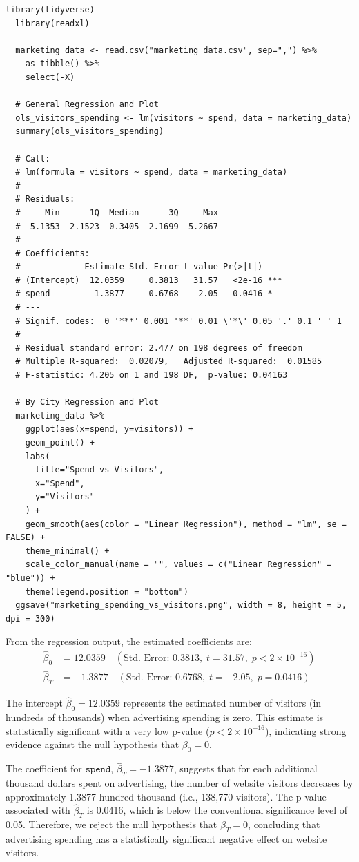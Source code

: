 \documentclass{article}
\begin{document}
\begin{lstlisting}[style=Rstyle, caption=Linear Model for Visitors]
  library(tidyverse)
  library(readxl)
  
  marketing_data <- read.csv("marketing_data.csv", sep=",") %>% 
    as_tibble() %>% 
    select(-X)
  
  # General Regression and Plot
  ols_visitors_spending <- lm(visitors ~ spend, data = marketing_data)
  summary(ols_visitors_spending)
  
  # Call:
  # lm(formula = visitors ~ spend, data = marketing_data)
  # 
  # Residuals:
  #     Min      1Q  Median      3Q     Max 
  # -5.1353 -2.1523  0.3405  2.1699  5.2667 
  # 
  # Coefficients:
  #             Estimate Std. Error t value Pr(>|t|)    
  # (Intercept)  12.0359     0.3813   31.57   <2e-16 ***
  # spend        -1.3877     0.6768   -2.05   0.0416 *  
  # ---
  # Signif. codes:  0 '***' 0.001 '**' 0.01 \'*\' 0.05 '.' 0.1 ' ' 1
  # 
  # Residual standard error: 2.477 on 198 degrees of freedom
  # Multiple R-squared:  0.02079,	Adjusted R-squared:  0.01585 
  # F-statistic: 4.205 on 1 and 198 DF,  p-value: 0.04163
  
  # By City Regression and Plot
  marketing_data %>% 
    ggplot(aes(x=spend, y=visitors)) +
    geom_point() +
    labs(
      title="Spend vs Visitors",
      x="Spend",
      y="Visitors"
    ) +
    geom_smooth(aes(color = "Linear Regression"), method = "lm", se = FALSE) +
    theme_minimal() +
    scale_color_manual(name = "", values = c("Linear Regression" = "blue")) +
    theme(legend.position = "bottom")
  ggsave("marketing_spending_vs_visitors.png", width = 8, height = 5, dpi = 300)
\end{lstlisting}

From the regression output, the estimated coefficients are:
\[
\begin{aligned}
\hat{\beta}_0 &= 12.0359 \quad (\text{Std. Error: } 0.3813, \; t = 31.57, \; p < 2 \times 10^{-16}) \\
\hat{\beta}_T &= -1.3877 \quad (\text{Std. Error: } 0.6768, \; t = -2.05, \; p = 0.0416)
\end{aligned}
\]

The intercept \(\hat{\beta}_0 = 12.0359\) represents the estimated number of visitors (in hundreds of thousands) when advertising spending is zero. This estimate is statistically significant with a very low p-value (\(p < 2 \times 10^{-16}\)), indicating strong evidence against the null hypothesis that \(\beta_0 = 0\).

The coefficient for \(\texttt{spend}\), \(\hat{\beta}_T = -1.3877\), suggests that for each additional thousand dollars spent on advertising, the number of website visitors decreases by approximately 1.3877 hundred thousand (i.e., 138,770 visitors). The p-value associated with \(\hat{\beta}_T\) is 0.0416, which is below the conventional significance level of 0.05. Therefore, we reject the null hypothesis that \(\beta_T = 0\), concluding that advertising spending has a statistically significant negative effect on website visitors.
\end{document}
